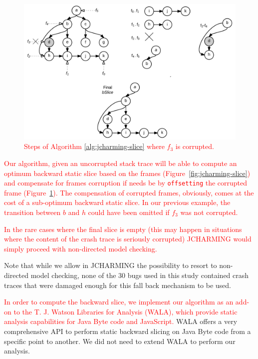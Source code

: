 \documentclass[times, doublespace]{smrauth}
\newcommand{\red}[1]{\textcolor{red}{#1}}
\begin{document}
{\vspace*{0.3cm}


\begin{figure}
  \centering
    \includegraphics[scale=.20]{media/algo.png}
    \caption{\red{Steps of Algorithm \ref{alg:jcharming-slice} where $f_3$ is corrupted.}
    \label{fig:jcharming-algo}}
\end{figure}

\red{Our algorithm, given an uncorrupted stack trace will be able to compute an optimum backward static slice based on the frames (Figure~\ref{fig:jcharming-slice}) and compensate for frames corruption if needs be by \texttt{offsetting} the corrupted frame (Figure~\ref{fig:jcharming-algo}).
The compensation of corrupted frames, obviously, comes at the cost of a sub-optimum backward static slice.
In our previous example, the transition between $b$ and $h$ could have been omitted if $f_3$ was not corrupted.
}


\red{In the rare cases where the final slice is empty (this
may happen in situations where the content of the crash trace
is seriously corrupted) JCHARMING would simply
proceed with non-directed model checking.}




Note that while we allow in JCHARMING the possibility to resort to non-directed
model
checking, none of the 30 bugs used in this study contained crash traces
that were damaged enough for this fall back mechanism to be used.

\red{In order to compute the backward slice, we implement our
algorithm as an add-on to the T. J. Watson
Libraries for Analysis (WALA)\cite{IBM2006}, which provide static
analysis capabilities for Java Byte code and JavaScript.}  WALA offers a very comprehensive API
to perform static backward slicing on Java Byte code from a
specific point to another.
We did not need to extend WALA to perform our
analysis.



}
\end{document}
